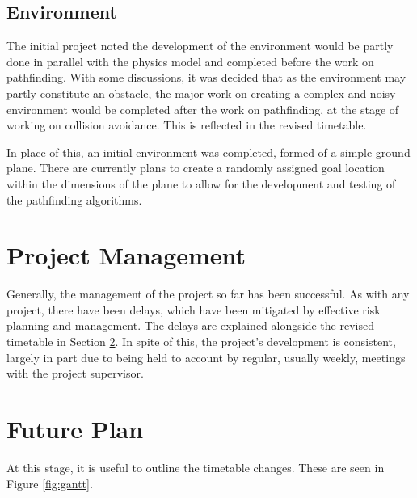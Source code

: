 \documentclass{article}
\begin{document}
\subsection{Environment}
The initial project noted the development of the environment would be partly done in parallel with the physics model and completed before the work on pathfinding. With some discussions, it was decided that as the environment may partly constitute an obstacle, the major work on creating a complex and noisy environment would be completed after the work on pathfinding, at the stage of working on collision avoidance. This is reflected in the revised timetable.

In place of this, an initial environment was completed, formed of a simple ground plane. There are currently plans to create a randomly assigned goal location within the dimensions of the plane to allow for the development and testing of the pathfinding algorithms.

\section{Project Management}

Generally, the management of the project so far has been successful. As with any project, there have been delays, which have been mitigated by effective risk planning and management. The delays are explained alongside the revised timetable in Section \ref{sec:timetable}. In spite of this, the project's development is consistent, largely in part due to being held to account by regular, usually weekly, meetings with the project supervisor.


\section{Future Plan}
\label{sec:timetable}

At this stage, it is useful to outline the timetable changes. These are seen in Figure \ref{fig:gantt}.
\end{document}
